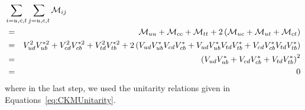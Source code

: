 \begin{eqnarray}
\lefteqn{\sum\limits_{i=u,c,t}\sum\limits_{j=u,c,t}\mathcal{M}_{ij}}
\nonumber\\
&=& 
\mathcal{M}_{uu} + \mathcal{M}_{cc} + \mathcal{M}_{tt} 
+ 2\left(\mathcal{M}_{uc} + \mathcal{M}_{ut} + \mathcal{M}_{ct}\right)
\nonumber\\
&=& V_{ud}^2 V_{ub}^{*2} 
+ 
V_{cd}^2 V_{cb}^{*2}
+
V_{td}^2 V_{tb}^{*2}
+
2 \left(
V_{ud} V_{ub}^{*}V_{cd} V_{cb}^{*}
+ V_{ud} V_{ub}^{*}V_{td} V_{tb}^{*}
+V_{cd} V_{cb}^{*}V_{td} V_{tb}^{*}
\right)
\nonumber\\ &=&
\left(V_{ud} V_{ub}^{*} 
+ 
V_{cd} V_{cb}^{*}
+
V_{td} V_{tb}^{*}\right)^2
\nonumber\\ &=& 0
\end{eqnarray}
where in the last step, we used the unitarity relations given in Equations~\ref{eq:CKMUnitarity}. 


